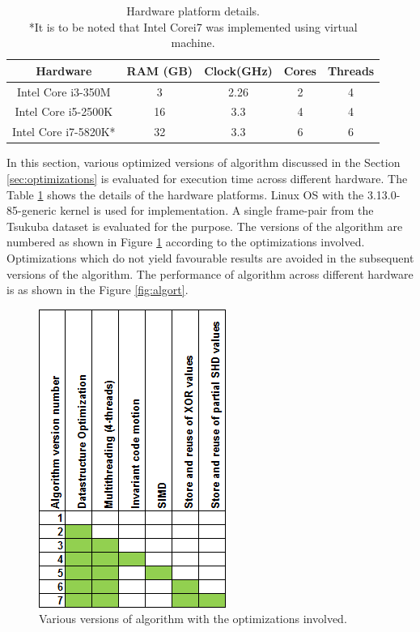 \begin{table}[!htbp]
\centering
\begin{tabular}{@{}|c|c|c|c|c|@{}}
\toprule
\textbf{Hardware}    & \textbf{RAM (GB)} & \textbf{Clock(GHz)} & \textbf{Cores} & \textbf{Threads} \\ \midrule
Intel Core i3-350M   & 3                 & 2.26                & 2              & 4                \\ \midrule
Intel Core i5-2500K  & 16                & 3.3                 & 4              & 4                \\ \midrule
Intel Core i7-5820K* & 32                & 3.3                 & 6              & 6                \\ \bottomrule
\end{tabular}
\captionsetup{justification=centering}
\caption{Hardware platform details. \\ *It is to be noted that Intel Corei7 was implemented using virtual machine.}
\label{tab:hwplat}
\end{table}

In this section, various optimized versions of algorithm discussed in the Section \ref{sec:optimizations} is evaluated for execution time across different hardware. The Table \ref{tab:hwplat} shows the details of the hardware platforms. Linux OS with the 3.13.0-85-generic kernel is used for implementation. A single frame-pair from the Tsukuba dataset is evaluated for the purpose. The versions of the algorithm are numbered as shown in Figure \ref{fig:algover} according to the optimizations involved. Optimizations which do not yield favourable results are avoided in the subsequent versions of the algorithm. The performance of algorithm across different hardware is as shown in the Figure \ref{fig:algort}.

\begin{figure}[!htbp]
    \center
    \captionsetup{justification=centering}
    \includegraphics[width=.4\linewidth]{figures/AlgoVersions}
    \caption{Various versions of algorithm with the optimizations involved.}
    \label{fig:algover}
\end{figure}

